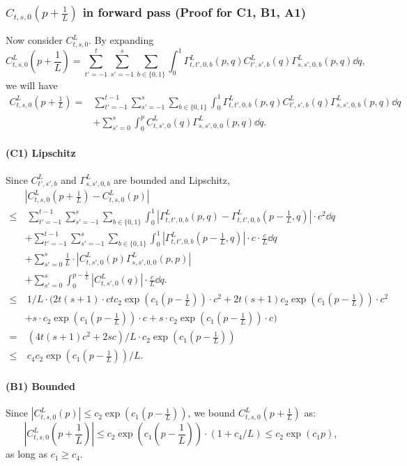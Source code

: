 \subsubsection{$C_{t,s,0}(p+\frac1L)$ in forward pass (Proof for C1, B1, A1)}

Now consider $C^L_{t,s,0}$. By expanding 
\[C^L_{t,s,0}(p+\frac1L)=\sum_{t'=-1}^{t}\sum_{s'=-1}^{s}\sum_{b\in\{0,1\}}\int_0^1 \Gamma^L_{t,t',0,b}(p,q) C^L_{t',s',b}(q)\Gamma^L_{s,s',0,b}(p,q) \dd q,\]
we will have 
\begin{align*}
    C^L_{t,s,0}(p+\frac1L)=& \sum_{t'=-1}^{t-1}\sum_{s'=-1}^{s}\sum_{b\in\{0,1\}}\int_0^1 \Gamma^L_{t,t',0,b}(p,q) C^L_{t',s',b}(q)\Gamma^L_{s,s',0,b}(p,q) \dd q \\
    & + \sum_{s'=0}^{s}\int_0^{p} C^L_{t,s',0}(q)\Gamma^L_{s,s',0,0}(p,q) \dd q.
\end{align*}
\paragraph{(C1) Lipschitz} Since $C^L_{t',s',b}$ and $\Gamma^L_{s,s',0,b}$ are bounded and Lipschitz,
\begin{align*}
    & |C^L_{t,s,0}(p+\frac1L) - C^L_{t,s,0}(p)|\\
    \leq &~ \sum_{t'=-1}^{t-1}\sum_{s'=-1}^{s}\sum_{b\in\{0,1\}}\int_0^1 |\Gamma^L_{t,t',0,b}(p,q) - \Gamma^L_{t,t',0,b}(p-\frac1L,q)| \cdot c^2 \dd q \\
    & + \sum_{t'=-1}^{t-1}\sum_{s'=-1}^{s}\sum_{b\in\{0,1\}}\int_0^1 |\Gamma^L_{t,t',0,b}(p-\frac1L,q)| \cdot c\cdot \frac cL \dd q \\
    & + \sum_{s'=0}^{s} \frac1L \cdot |C^L_{t,s',0}(p)\Gamma^L_{s,s',0,0}(p,p)| \\
    & + \sum_{s'=0}^{s}\int_0^{p-\frac1L} |C^L_{t,s',0}(q)|\cdot \frac cL \dd q.\\
    \leq &~ 1/L \cdot (2t(s+1)  \cdot ctc_2\exp(c_1 (p-\frac1L))\cdot c^2 + 2t(s+1) c_2\exp(c_1 (p-\frac1L)) \cdot c^2\\
    & +   s \cdot  c_2\exp(c_1 (p-\frac1L))\cdot c + s \cdot c_2\exp(c_1 (p-\frac1L)) \cdot c) \\
    = &~ (4t(s+1)c^2+2sc)/L\cdot  c_2\exp(c_1 (p-\frac1L))\\
    \leq &~ c_4 c_2\exp(c_1 (p-\frac1L)) / L.
\end{align*}
\paragraph{(B1) Bounded} Since $|C^L_{t,s,0}(p)|\leq c_2\exp(c_1 (p-\frac1L))$, we bound $C^L_{t,s,0}(p+\frac1L)$ as:
\[|C^L_{t,s,0}(p+\frac1L)|\leq c_2\exp(c_1 (p-\frac1L)) \cdot (1 + c_4/L)\leq c_2\exp(c_1 p),\]
as long as $c_1 \geq c_4$.
